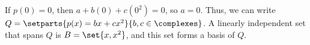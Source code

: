 If $p(0) = 0$, then $a + b(0) + c(0^2) = 0$, so $a = 0$.  
Thus, we can write $Q = \setparts{p(x) = bx + cx^2}{b, c\in\complexes}$.
A linearly independent set that spans $Q$ is $B=\set{x, x^2}$, and this set forms a basis of $Q$.



